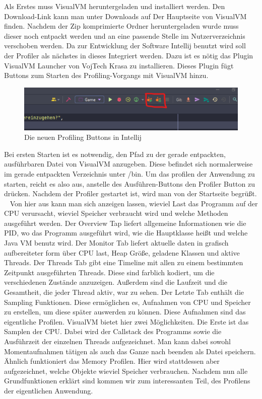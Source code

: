 \documentclass[a4paper,12pt]{scrreprt}
\begin{document}
Als Erstes muss VisualVM heruntergeladen und installiert werden. Den Download-Link kann man unter Downloads auf Der Hauptseite von VisualVM finden. Nachdem der Zip komprimierte Ordner heruntergeladen wurde muss dieser noch entpackt werden und an eine passende Stelle im Nutzerverzeichnis verschoben werden. Da zur Entwicklung der Software Intellij benutzt wird soll der Profiler als nächstes in dieses Integriert werden. Dazu ist es nötig das Plugin VisualVM Launcher von VojTech Krasa zu installieren. Dieses Plugin fügt Buttons zum Starten des Profiling-Vorgangs mit VisualVM hinzu. ~\cite{fig:Intellij_VisualVM_Button}
\begin{figure}[t]
  \centering
  \includegraphics{Intellij_VisualVM_Button}
  \caption{Die neuen Profiling Buttons in Intellij}
  \label{fig:Intellij_VisualVM_Button}
\end{figure}
Bei ersten Starten ist es notwendig, den Pfad zu der gerade entpackten, ausführbaren Datei von VisualVM anzugeben. Diese befindet sich normalerweise im gerade entpackten Verzeichnis unter /bin. Um das profilen der Anwendung zu starten, reicht es also aus, anstelle des Ausführen-Buttons den Profiler Button zu drücken. Nachdem der Profiler gestartet ist, wird man von der Startseite begrüßt. ~\cite{fig:VisualVM_MainPage} Von hier aus kann man sich anzeigen lassen, wieviel Last das Programm auf der CPU verursacht, wieviel Speicher verbraucht wird und welche Methoden ausgeführt werden. Der Overview Tap liefert allgemeine Informationen wie die PID, wo das Programm ausgeführt wird, wie die Hauptklasse heißt und welche Java 
VM benutz wird. Der Monitor Tab liefert aktuelle daten in grafisch aufbereiteter form über CPU last, Heap Größe, geladene Klassen und aktive Threads.
Der Threads Tab gibt eine Timeline mit allen zu einem bestimmten Zeitpunkt ausgeführten Threads. Diese sind farblich kodiert, um die verschiedenen Zustände anzuzeigen. Außerdem sind die Laufzeit und die Gesamtheit, die jeder Thread aktiv, war zu sehen. Der Letzte Tab enthält die Sampling Funktionen. Diese ermöglichen es, Aufnahmen von CPU und Speicher zu erstellen, um diese später auswerden zu können. Diese Aufnahmen sind das eigentliche Profilen. VisualVM bietet hier zwei Möglichkeiten. Die Erste ist das Samplen der CPU. Dabei wird der Callstack des Programms sowie die Ausführzeit der einzelnen Threads aufgezeichnet. Man kann dabei sowohl Momentaufnahmen tätigen als auch das Ganze nach beenden als Datei speichern. Ähnlich funktioniert das Memory Profilen. Hier wird stattdessen aber aufgezeichnet, welche Objekte wieviel Speicher verbrauchen. Nachdem nun alle Grundfunktionen erklärt sind kommen wir zum interessanten Teil, des Profilens der eigentlichen Anwendung.
\end{document}
